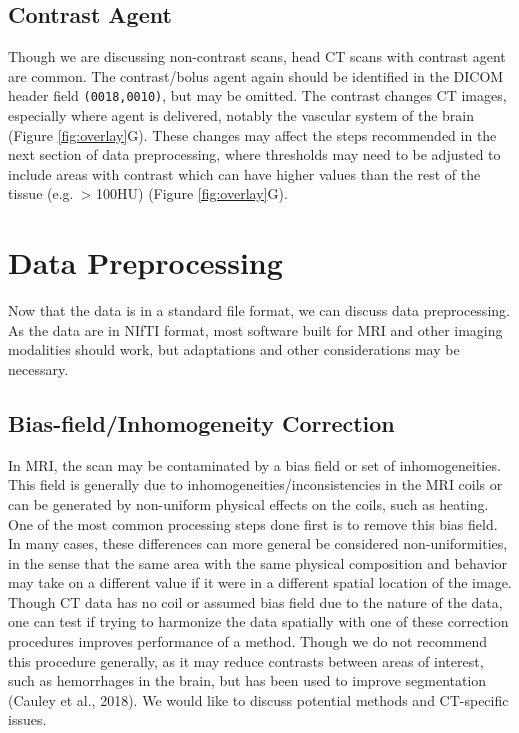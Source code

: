 \documentclass[utf8]{frontiersSCNS}
\begin{document}
\hypertarget{contrast-agent}{%
\subsection{Contrast Agent}\label{contrast-agent}}

Though we are discussing non-contrast scans, head CT scans with contrast agent are common. The contrast/bolus agent again should be identified in the DICOM header field \texttt{(0018,0010)}, but may be omitted. The contrast changes CT images, especially where agent is delivered, notably the vascular system of the brain (Figure \ref{fig:overlay}G). These changes may affect the steps recommended in the next section of data preprocessing, where thresholds may need to be adjusted to include areas with contrast which can have higher values than the rest of the tissue (e.g.~\textgreater{} 100HU) (Figure \ref{fig:overlay}G).

\hypertarget{data-preprocessing}{%
\section{Data Preprocessing}\label{data-preprocessing}}

Now that the data is in a standard file format, we can discuss data preprocessing. As the data are in NIfTI format, most software built for MRI and other imaging modalities should work, but adaptations and other considerations may be necessary.

\hypertarget{bias-fieldinhomogeneity-correction}{%
\subsection{Bias-field/Inhomogeneity Correction}\label{bias-fieldinhomogeneity-correction}}

In MRI, the scan may be contaminated by a bias field or set of inhomogeneities. This field is generally due to inhomogeneities/inconsistencies in the MRI coils or can be generated by non-uniform physical effects on the coils, such as heating. One of the most common processing steps done first is to remove this bias field. In many cases, these differences can more general be considered non-uniformities, in the sense that the same area with the same physical composition and behavior may take on a different value if it were in a different spatial location of the image. Though CT data has no coil or assumed bias field due to the nature of the data, one can test if trying to harmonize the data spatially with one of these correction procedures improves performance of a method. Though we do not recommend this procedure generally, as it may reduce contrasts between areas of interest, such as hemorrhages in the brain, but has been used to improve segmentation (Cauley et al., 2018). We would like to discuss potential methods and CT-specific issues.
\end{document}
